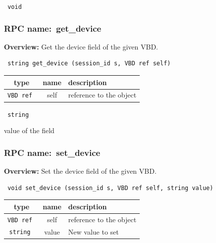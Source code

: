 \vspace{0.3cm}

{\tt 
void
}



\vspace{0.3cm}
\vspace{0.3cm}
\vspace{0.3cm}
\subsubsection{RPC name:~get\_device}

{\bf Overview:} 
Get the device field of the given VBD.

\begin{verbatim} string get_device (session_id s, VBD ref self)\end{verbatim}



 
\vspace{0.3cm}
\begin{tabular}{|c|c|p{7cm}|}
 \hline
{\bf type} & {\bf name} & {\bf description} \\ \hline
{\tt VBD ref } & self & reference to the object \\ \hline 

\end{tabular}

\vspace{0.3cm}

{\tt 
string
}


value of the field
\vspace{0.3cm}
\vspace{0.3cm}
\vspace{0.3cm}
\subsubsection{RPC name:~set\_device}

{\bf Overview:} 
Set the device field of the given VBD.

\begin{verbatim} void set_device (session_id s, VBD ref self, string value)\end{verbatim}



 
\vspace{0.3cm}
\begin{tabular}{|c|c|p{7cm}|}
 \hline
{\bf type} & {\bf name} & {\bf description} \\ \hline
{\tt VBD ref } & self & reference to the object \\ \hline 

{\tt string } & value & New value to set \\ \hline 

\end{tabular}

